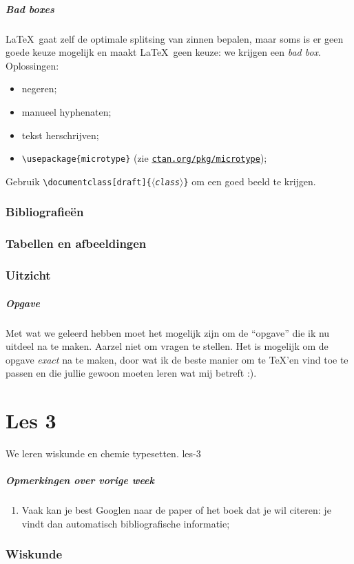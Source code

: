 \documentclass{beamer}
\newcommand\package[1]{\href{http://ctan.org/pkg/#1}{\texttt{ctan.org/pkg/#1}}}
\newcommand\exercise{
\begin{frame}
  \frametitle{Opgave}

  Met wat we geleerd hebben moet het mogelijk zijn om de ``opgave'' die ik nu uitdeel na te maken. Aarzel niet om vragen te stellen. Het is mogelijk om de opgave \emph{exact} na te maken, door wat ik de beste manier om te \TeX'en vind toe te passen en die jullie gewoon moeten leren wat mij betreft :).
\end{frame}
}
\begin{document}
\begin{frame}
  \frametitle{Bad boxes}

  \LaTeX\ gaat zelf de optimale splitsing van zinnen bepalen, maar soms is er geen goede keuze mogelijk en maakt \LaTeX\ geen keuze: we krijgen een \emph{bad box}. Oplossingen:
  \begin{itemize}
    \item negeren;
    \item manueel hyphenaten;
    \item tekst herschrijven;
    \item \texttt{\textcolor{uagreen}{\textbackslash usepackage}\{microtype\}} (zie \package{microtype});
  \end{itemize}

  Gebruik \texttt{\textcolor{uagreen}{\textbackslash documentclass}[draft]\{$\langle$\textsl{class}$\rangle$\}} om een goed beeld te krijgen.
\end{frame}

\section{Bibliografie\"en}

\section{Tabellen en afbeeldingen}

\section{Uitzicht}


\exercise

\part{Les 3}
\lecture
{We leren wiskunde en chemie typesetten.}
{les-3}
\begin{frame}
  \frametitle{Opmerkingen over vorige week}

  \begin{enumerate}
    \item Vaak kan je best Googlen naar de paper of het boek dat je wil citeren: je vindt dan automatisch bibliografische informatie;
  \end{enumerate}
\end{frame}
\section{Wiskunde}

\end{document}
